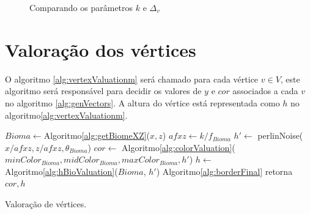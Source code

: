 \begin{figure}[H]
     \centering
     \hspace{0.1cm}
     \hspace{0.1cm}
     \caption{Comparando os parâmetros $k$ e $\Delta_{v}$}
     \label{fig:parametrosGrid}
\end{figure}

\section{Valoração dos vértices}

O algoritmo \ref{alg:vertexValuationm} será chamado para cada vértice $v \in V$, 
este algoritmo será responsável para decidir os valores de $y$ e $cor$ associados
a cada $v$ no algoritmo \ref{alg:genVectors}. A altura do vértice está representada
como $h$ no algoritmo\ref{alg:vertexValuationm}.

\begin{algorithm}[H]\label{alg:vertexValuationm}%
    $Bioma \leftarrow $Algoritmo\ref{alg:getBiomeXZ}($x, z$)\;
    $afxz \leftarrow k/f_{Bioma}$\;
    $h' \leftarrow$ perlinNoise($x/afxz, z/afxz, \theta_{Bioma}$)\;
    $cor \leftarrow$ Algoritmo\ref{alg:colorValuation}($minColor_{Bioma}, midColor_{Bioma}, maxColor_{Bioma}, h'$)\;
    $h \leftarrow$ Algoritmo\ref{alg:hBioValuation}($Bioma$, $h'$)\;
    Algoritmo\ref{alg:borderFinal}\;
    retorna $cor, h$\;
    \caption{Valoração de vértices.}
\end{algorithm}

